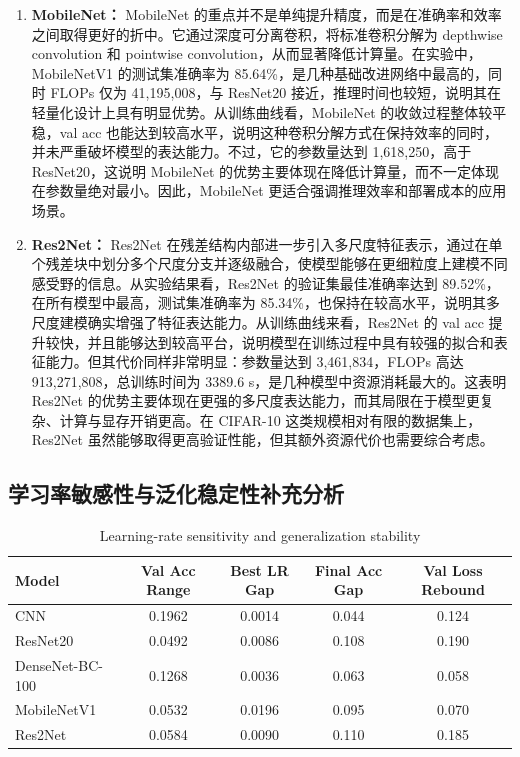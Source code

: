 \documentclass[a4paper]{article}
\begin{document}
\begin{enumerate}
    \item \textbf{MobileNet：}
    MobileNet 的重点并不是单纯提升精度，而是在准确率和效率之间取得更好的折中。它通过深度可分离卷积，将标准卷积分解为 depthwise convolution 和 pointwise convolution，从而显著降低计算量\cite{mobilenet}。在实验中，MobileNetV1 的测试集准确率为 85.64\%，是几种基础改进网络中最高的，同时 FLOPs 仅为 41,195,008，与 ResNet20 接近，推理时间也较短，说明其在轻量化设计上具有明显优势。从训练曲线看，MobileNet 的收敛过程整体较平稳，val acc 也能达到较高水平，说明这种卷积分解方式在保持效率的同时，并未严重破坏模型的表达能力。不过，它的参数量达到 1,618,250，高于 ResNet20，这说明 MobileNet 的优势主要体现在降低计算量，而不一定体现在参数量绝对最小。因此，MobileNet 更适合强调推理效率和部署成本的应用场景。

    \item \textbf{Res2Net：}
    Res2Net 在残差结构内部进一步引入多尺度特征表示，通过在单个残差块中划分多个尺度分支并逐级融合，使模型能够在更细粒度上建模不同感受野的信息\cite{Res2Net}。从实验结果看，Res2Net 的验证集最佳准确率达到 89.52\%，在所有模型中最高，测试集准确率为 85.34\%，也保持在较高水平，说明其多尺度建模确实增强了特征表达能力。从训练曲线来看，Res2Net 的 val acc 提升较快，并且能够达到较高平台，说明模型在训练过程中具有较强的拟合和表征能力。但其代价同样非常明显：参数量达到 3,461,834，FLOPs 高达 913,271,808，总训练时间为 3389.6 s，是几种模型中资源消耗最大的。这表明 Res2Net 的优势主要体现在更强的多尺度表达能力，而其局限在于模型更复杂、计算与显存开销更高。在 CIFAR-10 这类规模相对有限的数据集上，Res2Net 虽然能够取得更高验证性能，但其额外资源代价也需要综合考虑。
\end{enumerate}

\subsection{学习率敏感性与泛化稳定性补充分析}
\begin{table}[htbp]
\centering
\caption{Learning-rate sensitivity and generalization stability}
\scriptsize
\begin{tabular}{lcccc}
\toprule
Model & Val Acc Range & Best LR Gap & Final Acc Gap & Val Loss Rebound \\
\midrule
CNN & 0.1962 & 0.0014 & 0.044 & 0.124 \\
ResNet20 & 0.0492 & 0.0086 & 0.108 & 0.190 \\
DenseNet-BC-100 & 0.1268 & 0.0036 & 0.063 & 0.058 \\
MobileNetV1 & 0.0532 & 0.0196 & 0.095 & 0.070 \\
Res2Net & 0.0584 & 0.0090 & 0.110 & 0.185 \\
\bottomrule
\end{tabular}
\label{tab:sensitivity_stability}
\end{table}
\end{document}

